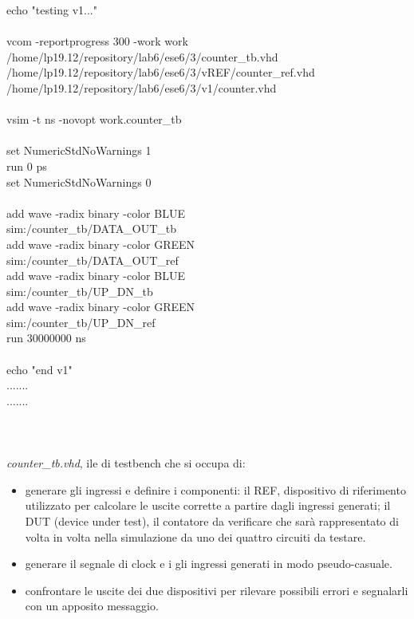 echo "testing v1..."\\
\\
vcom -reportprogress 300 -work work\\ /home/lp19.12/repository/lab6/ese6/3/counter\_tb.vhd\\ /home/lp19.12/repository/lab6/ese6/3/vREF/counter\_ref.vhd\\ /home/lp19.12/repository/lab6/ese6/3/v1/counter.vhd\\
\\
vsim -t ns -novopt work.counter\_tb\\
\\
set NumericStdNoWarnings 1\\
run 0 ps\\
set NumericStdNoWarnings 0\\
\\
add wave -radix binary   -color BLUE\\      sim:/counter\_tb/DATA\_OUT\_tb\\
add wave -radix binary   -color GREEN\\    sim:/counter\_tb/DATA\_OUT\_ref\\
add wave -radix binary   -color BLUE\\     sim:/counter\_tb/UP\_DN\_tb\\
add wave -radix binary   -color GREEN \\   sim:/counter\_tb/UP\_DN\_ref\\
run 30000000 ns\\
\\
echo "end v1"\\
.......\\
.......\\
\\
\\
\\
\textit{counter\_tb.vhd}, ile di testbench che si occupa di:
\begin{itemize}
	\item {generare gli ingressi e definire i componenti: il REF, dispositivo di riferimento utilizzato per calcolare le uscite corrette a partire dagli ingressi generati; il DUT (device under test), il contatore da verificare che sarà rappresentato di volta in volta nella simulazione da uno dei quattro circuiti da testare.}
	\item {generare il segnale di clock e i gli ingressi generati in modo pseudo-casuale.}
	\item {confrontare le uscite dei due dispositivi per rilevare possibili errori e segnalarli con un apposito messaggio.}
\end{itemize}
